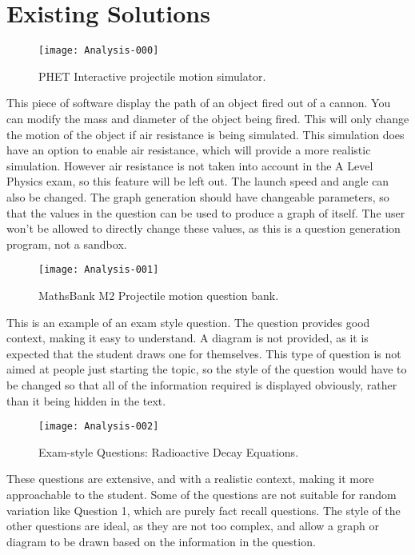 \section{Existing Solutions}
\begin{figure}[h]
	\centering
	\texttt{[image: Analysis-000]}
	\caption[PHET Interactive projectile motion simulator.]{PHET Interactive projectile motion simulator. \autocite{phet}}
	\label{phet}
\end{figure}
This piece of software display the path of an object fired out of a cannon. You can modify the mass and diameter of the object being fired. This will only change the motion of the object if air resistance is being simulated. This simulation does have an option to enable air resistance, which will provide a more realistic simulation. However air resistance is not taken into account in the A Level Physics exam, so this feature will be left out. The launch speed and angle can also be changed. The graph generation should have changeable parameters, so that the values in the question can be used to produce a graph of itself. The user won't be allowed to directly change these values, as this is a question generation program, not a sandbox.
\clearpage
\begin{figure}[h]
	\centering
	\texttt{[image: Analysis-001]}
	\caption[MathsBank M2 Projectile motion question bank.]{MathsBank M2 Projectile motion question bank.
	 \autocite{mb}}
 	\label{fig:mb}
\end{figure}
This is an example of an exam style question. The question provides good context, making it easy to understand. A diagram is not provided, as it is expected that the student draws one for themselves. This type of question is not aimed at people just starting the topic, so the style of the question would have to be changed so that all of the information required is displayed obviously, rather than it being hidden in the text.
\clearpage
\begin{figure}[h]
	\centering
	\texttt{[image: Analysis-002]}
	\caption[Exam-style Questions: Radioactive Decay Equations.]{Exam-style Questions: Radioactive Decay Equations. \autocite{scool}}
\end{figure}
These questions are extensive, and with a realistic context, making it more approachable to the student. Some of the questions are not suitable for random variation like Question 1, which are purely fact recall questions. The style of the other questions are ideal, as they are not too complex, and allow a graph or diagram to be drawn based on the information in the question.
